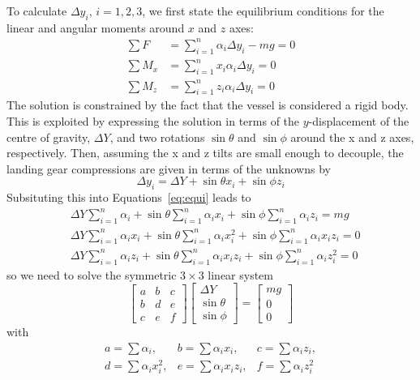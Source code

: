 \documentclass{article}
\begin{document}
To calculate $\Delta y_i$, $i=1,2,3$, we first state the equilibrium conditions for the linear and angular moments around $x$ and $z$ axes:
\begin{equation}\label{eq:equi}
\begin{split}
\sum F &= \sum_{i=1}^{n} \alpha_i \Delta y_i - m g = 0 \\
\sum M_x &= \sum_{i=1}^{n} x_i \alpha_i \Delta y_i = 0 \\
\sum M_z &= \sum_{i=1}^{n} z_i \alpha_i \Delta y_i = 0
\end{split}
\end{equation}
The solution is constrained by the fact that the vessel is considered a rigid body. This is exploited by expressing the solution in terms of the $y$-displacement of the centre of gravity, $\Delta Y$, and two rotations $\sin \theta$ and $\sin \phi$ around the x and z axes, respectively. Then, assuming the x and z tilts are small enough to decouple, the landing gear compressions are given in terms of the unknowns by
\begin{equation}\label{eq:prm}
\Delta y_i = \Delta Y + \sin \theta x_i + \sin \phi z_i
\end{equation}
Subsituting this into Equations~\ref{eq:equi} leads to
\begin{equation}
\begin{split}
&\Delta Y \sum_{i=1}^{n} \alpha_i + \sin\theta \sum_{i=1}^{n} \alpha_i x_i + \sin\phi \sum_{i=1}^{n} \alpha_i z_i = mg \\
&\Delta Y \sum_{i=1}^{n} \alpha_i x_i + \sin\theta \sum_{i=1}^{n} \alpha_i x_i^2 + \sin\phi \sum_{i=1}^{n} \alpha_i x_i z_i = 0 \\
&\Delta Y \sum_{i=1}^{n} \alpha_i z_i + \sin\theta \sum_{i=1}^{n} \alpha_i x_i z_i + \sin\phi \sum_{i=1}^{n} \alpha_i z_i^2 = 0
\end{split}
\end{equation}
so we need to solve the symmetric $3\times 3$ linear system
\begin{equation}\label{eq:linsys}
\left[\begin{array}{ccc}
a&b&c \\
b&d&e \\
c&e&f \end{array}\right]
\left[\begin{array}{c}
\Delta Y \\ \sin\theta \\ \sin\phi \end{array}\right]
=
\left[\begin{array}{c}
mg \\ 0 \\ 0 \end{array}\right]
\end{equation}
with
\begin{equation}
\begin{array}{lll}
a = \sum \alpha_i, & b = \sum \alpha_i x_i, & c = \sum \alpha_i z_i, \\
d = \sum \alpha_i x_i^2, & e = \sum \alpha_i x_i z_i, & f = \sum \alpha_i z_i^2
\end{array}
\end{equation}
\end{document}
